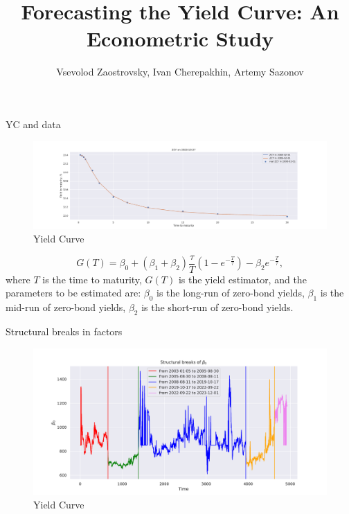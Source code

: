 \documentclass[aspectratio=169]{beamer}
\title{Forecasting the Yield Curve: An Econometric Study}
\subtitle{}
\author{Vsevolod Zaostrovsky, Ivan Cherepakhin, Artemy Sazonov}
\institute{Lomonosov Moscow State University}
\begin{document}
\maketitle

\begin{frame}{YC and data}
    \begin{figure}
        \includegraphics[scale=0.21]{fig/ZCYp.pdf}
        \caption{Yield Curve }
        \label{fig:YTMp}
    \end{figure}
    \begin{equation}\label{eq:NS}
        G(T) = \beta_0 + (\beta_1+\beta_2)\frac{\tau}{T}\left(1-e^{-\frac{T}{\tau}}\right)-\beta_2  e^{-\frac{T}{\tau}},
    \end{equation}
    where $T$ is the time to maturity, $G(T)$ is the yield estimator, 
    and the parameters to be estimated are: $\beta_0$ is the long-run of zero-bond yields, $\beta_1$ is the mid-run of zero-bond yields, 
    $\beta_2$ is the short-run of zero-bond yields.
    
\end{frame}

\begin{frame}{Structural breaks in factors}

    \begin{figure}
        \includegraphics[scale=0.43]{fig/StrBreaks.pdf}
        \caption{Yield Curve }
        \label{fig:StrBreaks}
    \end{figure}
\end{frame}
\end{document}
